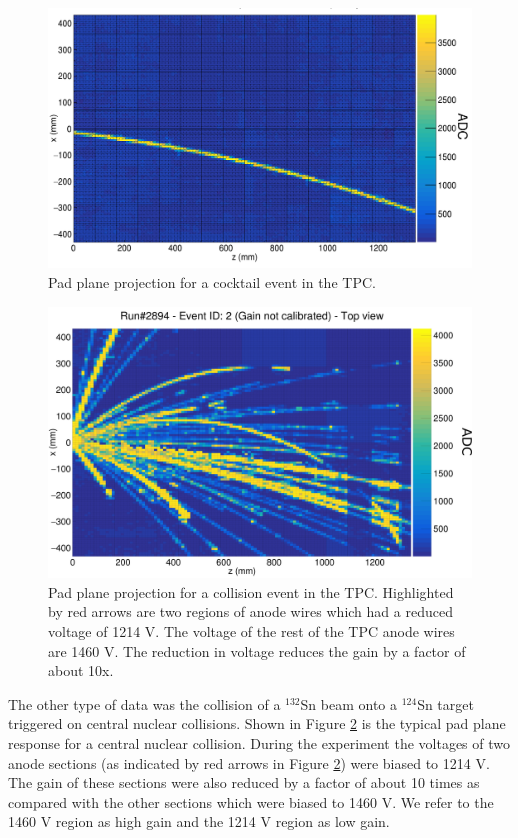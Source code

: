 \documentclass[review]{elsarticle}
\begin{document}
\begin{figure}[ht!]
\includegraphics[width=\linewidth]{cocktail.png}
\caption{Pad plane projection for a cocktail event in the TPC.}
\label{fig:cocktail}
\end{figure}

\begin{figure}[ht!]
\includegraphics[width=\linewidth]{data.png}
\caption{Pad plane projection for a collision event in the TPC. Highlighted by red arrows are two regions of anode wires which had a reduced voltage of 1214 V. The voltage of the rest of the TPC anode wires are 1460 V. The reduction in voltage reduces the gain by a factor of about 10x. }
\label{fig:data}
\end{figure}



The other type of data was the collision of a ${}^{132}$Sn beam onto a ${}^{124}$Sn target triggered on central nuclear collisions. Shown in Figure \ref{fig:data} is the typical pad plane response for a central nuclear collision. During the experiment the voltages of two anode sections (as indicated by red arrows in Figure \ref{fig:data}) were biased to 1214 V. The gain of these sections were also reduced by a factor of about 10 times as compared with the other sections which were biased to 1460 V. We refer to the 1460 V region as high gain and the 1214 V region as low gain. 
\end{document}
